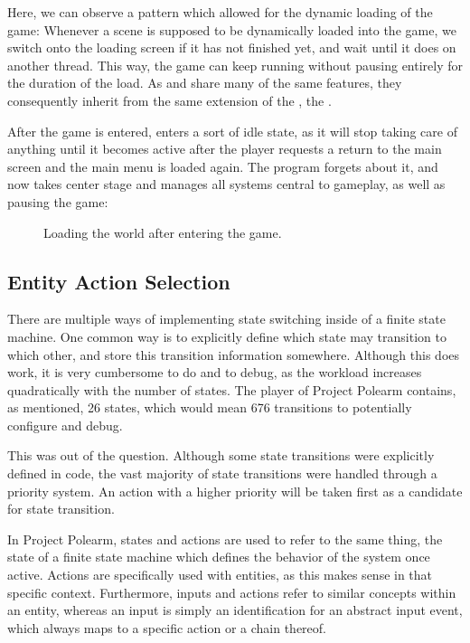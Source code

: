\documentclass[../Main.tex]{subfiles}
\begin{document}
Here, we can observe a pattern which allowed for the dynamic loading of the game: Whenever a scene is supposed to be dynamically loaded into the game, we switch onto the loading screen if it has not finished yet, and wait until it does on another thread. This way, the game can keep running without pausing entirely for the duration of the load. As  and  share many of the same features, they consequently inherit from the same extension of the , the .

After the game is entered,  enters a sort of idle state, as it will stop taking care of anything until it becomes active after the player requests a return to the main screen and the main menu is loaded again. The program forgets about it, and  now takes center stage and manages all systems central to gameplay, as well as pausing the game:

\begin{figure}[H]
    \centering
    
    \caption[Loading the world after entering the game. Own figure.]{Loading the world after entering the game.}
    \label{fig:world-loading}
\end{figure}

\subsection{Entity Action Selection}\label{sec:entity-action-selection}

There are multiple ways of implementing state switching inside of a finite state machine. One common way is to explicitly define which state may transition to which other, and store this transition information somewhere. Although this does work, it is very cumbersome to do and to debug, as the workload increases quadratically with the number of states. The player of Project Polearm contains, as mentioned, 26 states, which would mean 676 transitions to potentially configure and debug.

This was out of the question. Although some state transitions were explicitly defined in code, the vast majority of state transitions were handled through a priority system. An action with a higher priority will be taken first as a candidate for state transition.

In Project Polearm, states and actions are used to refer to the same thing, the state of a finite state machine which defines the behavior of the system once active. Actions are specifically used with entities, as this makes sense in that specific context. Furthermore, inputs and actions refer to similar concepts within an entity, whereas an input is simply an identification for an abstract input event, which always maps to a specific action or a chain thereof.
\end{document}
